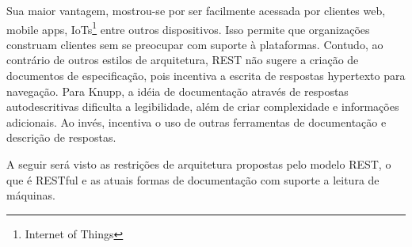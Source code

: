 Sua maior vantagem, mostrou-se por ser facilmente acessada por clientes web, mobile apps, IoTs\footnote{
  Internet of Things
} entre outros dispositivos. Isso permite que organizações construam clientes sem se preocupar com suporte à plataformas. Contudo, ao contrário de outros estilos de arquitetura, REST não sugere a criação de documentos de especificação, pois incentiva a escrita de respostas hypertexto para navegação. Para Knupp, a idéia de documentação através de respostas autodescritivas dificulta a legibilidade, além de criar complexidade e informações adicionais. Ao invés, incentiva o uso de outras ferramentas de documentação e descrição de respostas. \cite{Knupp2016}

A seguir será visto as restrições de arquitetura propostas pelo modelo REST, o que é RESTful e as atuais formas de documentação com suporte a leitura de máquinas.




